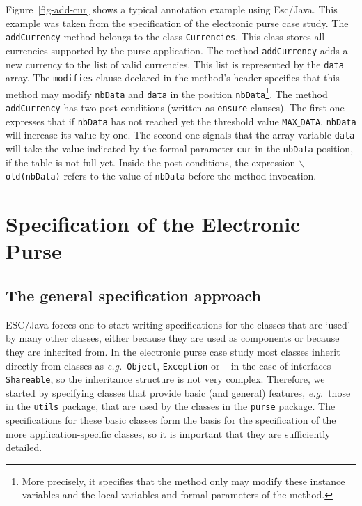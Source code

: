 \documentclass[a4paper]{llncs}
\begin{document}
Figure~\ref{fig-add-cur} shows a typical annotation example using
Esc/Java. This example was taken from the specification of the
electronic purse case study. The \texttt{addCurrency} method belongs
to the class \texttt{Currencies}. This class stores all currencies
supported by the purse application. The method
\texttt{addCurrency} adds a new currency to the list of valid
currencies. This list is represented by the
\texttt{data} array. The \texttt{modifies} clause declared in the
method's header specifies that
this method may modify \texttt{nbData} and
\texttt{data} in the position \texttt{nbData}\footnote{More precisely, it
specifies that the method only may modify these instance variables and
the local variables and formal parameters of the method.}. The method
\texttt{addCurrency} has 
two post-conditions (written as \texttt{ensure} clauses). The first
one expresses that if \texttt{nbData} has not reached yet the
threshold value \texttt{MAX$\_$DATA}, \texttt{nbData} will increase
its value by one. The second one signals that the array variable
\texttt{data} will take the value indicated by the formal parameter
\texttt{cur} in the \texttt{nbData} position, if the table is not full
yet. Inside the post-conditions, the expression
\texttt{$\backslash$old(nbData)} refers to the value of \texttt{nbData} 
before the method invocation.






\section{Specification of the Electronic Purse}
\label{SectSpecPurse}


\subsection{The general specification approach}
ESC/Java forces one to start writing specifications for the classes
that are `used' by many other classes, either because they are used as 
components or because they are inherited from. In the electronic purse 
case study most classes inherit directly from classes as
\emph{e.g.}~\texttt{Object}, \texttt{Exception} or -- in the case of
interfaces -- \texttt{Shareable}, so the inheritance structure is not
very complex. Therefore, we started by specifying classes that
provide basic (and general) features, \emph{e.g.}~those in the
\texttt{utils} package,
that are used by the classes in the \texttt{purse} package. The
specifications for these basic classes form the basis for the
specification of the more application-specific classes, so it is
important that they are sufficiently detailed.
\end{document}
